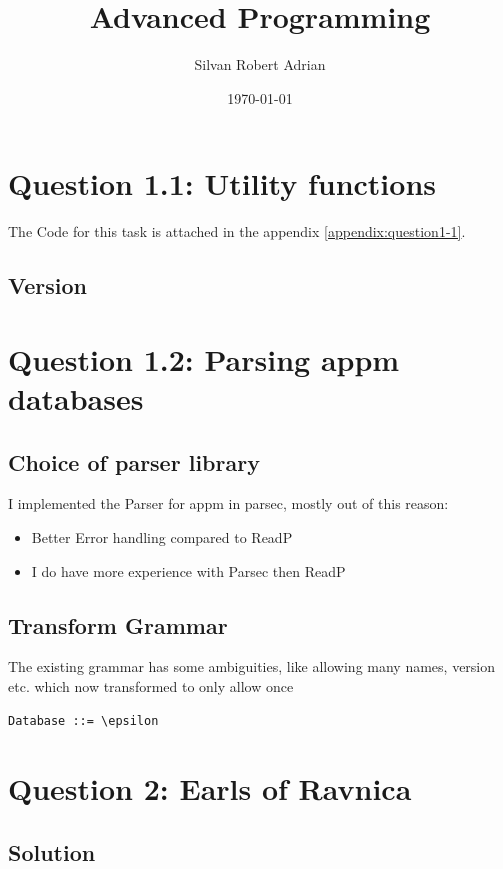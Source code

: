 \documentclass[12pt,a4paper]{article}
\newcommand{\subtitle}[1]{%
  \posttitle{%
    \par\end{center}
    \begin{center}\large#1\end{center}
    \vskip0.5em}%
}
\begin{document}
\title{Advanced Programming}
\subtitle{Exam 2018}

\author{Silvan Robert Adrian}
\date{\today}
	
\maketitle
\tableofcontents

\section{Question 1.1: Utility functions}
The Code for this task is attached in the appendix \ref{appendix:question1-1}.

\subsection{Version}


\section{Question 1.2: Parsing appm databases}
\subsection{Choice of parser library}
I implemented the Parser for appm in parsec, mostly out of this reason:
\begin{itemize}
	\item Better Error handling compared to ReadP
	\item I do have more experience with Parsec then ReadP
\end{itemize}

\subsection{Transform Grammar}
The existing grammar has some ambiguities, like allowing many names, version etc. which now transformed to only allow once
\begin{verbatim}
Database ::= \epsilon

\end{verbatim}


\section{Question 2: Earls of Ravnica}
\subsection{Solution}
\end{document}
